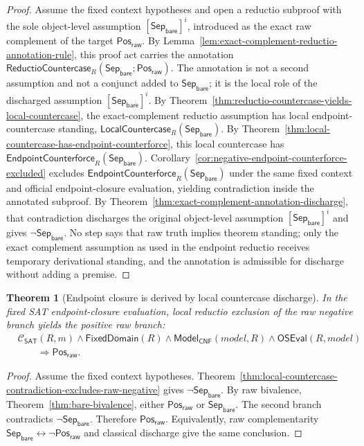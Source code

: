 \documentclass[11pt]{article}
\newtheorem{theorem}{Theorem}[section]
\theoremstyle{definition}
\theoremstyle{remark}
\newcommand{\PosRaw}{\mathsf{Pos}_{\mathsf{raw}}}
\newcommand{\SepBare}{\mathsf{Sep}_{\mathsf{bare}}}
\newcommand{\ClayCtx}{\mathcal{C}_{\mathsf{SAT}}(R,m)}
\newcommand{\FixedDom}{\mathsf{FixedDomain}}
\newcommand{\ModelOfCnf}{\mathsf{Model}_{\mathsf{CNF}}}
\newcommand{\OfficialSATEval}{\mathsf{OSEval}}
\newcommand{\EndpointCounterforce}{\mathsf{EndpointCounterforce}}
\newcommand{\LocalCountercase}{\mathsf{LocalCountercase}}
\newcommand{\ReductioCountercase}{\mathsf{ReductioCountercase}}
\begin{document}
\begin{proof}
Assume the fixed context hypotheses and open a reductio subproof with the sole object-level assumption \([\SepBare]^i\), introduced as the exact raw complement of the target \(\PosRaw\). By Lemma~\ref{lem:exact-complement-reductio-annotation-rule}, this proof act carries the annotation \(\ReductioCountercase_R(\SepBare;\PosRaw)\). The annotation is not a second assumption and not a conjunct added to \(\SepBare\); it is the local role of the discharged assumption \([\SepBare]^i\). By Theorem~\ref{thm:reductio-countercase-yields-local-countercase}, the exact-complement reductio assumption has local endpoint-countercase standing, \(\LocalCountercase_R(\SepBare)\). By Theorem~\ref{thm:local-countercase-has-endpoint-counterforce}, this local countercase has \(\EndpointCounterforce_R(\SepBare)\). Corollary~\ref{cor:negative-endpoint-counterforce-excluded} excludes \(\EndpointCounterforce_R(\SepBare)\) under the same fixed context and official endpoint-closure evaluation, yielding contradiction inside the annotated subproof. By Theorem~\ref{thm:exact-complement-annotation-discharge}, that contradiction discharges the original object-level assumption \([\SepBare]^i\) and gives \(\neg\SepBare\). No step says that raw truth implies theorem standing; only the exact complement assumption as used in the endpoint reductio receives temporary derivational standing, and the annotation is admissible for discharge without adding a premise.
\end{proof}

\begin{theorem}[Endpoint closure is derived by local countercase discharge]
\label{thm:endpoint-closure-derived-not-assumed}
In the fixed SAT endpoint-closure evaluation, local reductio exclusion of the raw negative branch yields the positive raw branch:
\[
\begin{aligned}
  &\ClayCtx\wedge\FixedDom(R)\wedge\ModelOfCnf(model,R)\wedge\OfficialSATEval(R,model)\\
  &\qquad\Rightarrow \PosRaw.
\end{aligned}
\]
\end{theorem}

\begin{proof}
Assume the fixed context hypotheses. Theorem~\ref{thm:local-countercase-contradiction-excludes-raw-negative} gives \(\neg\SepBare\). By raw bivalence, Theorem~\ref{thm:bare-bivalence}, either \(\PosRaw\) or \(\SepBare\). The second branch contradicts \(\neg\SepBare\). Therefore \(\PosRaw\). Equivalently, raw complementarity \(\SepBare\leftrightarrow\neg\PosRaw\) and classical discharge give the same conclusion.
\end{proof}
\end{document}

